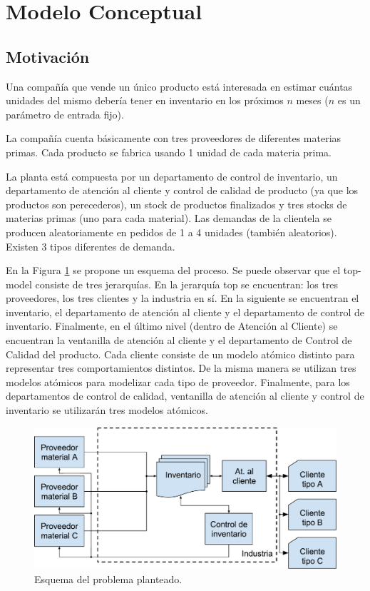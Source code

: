 \documentclass[10pt]{article}
\begin{document}
\section{Modelo Conceptual}
\subsection{Motivación}

Una compañía que vende un único producto está interesada en estimar cuántas unidades del mismo debería tener en inventario en los próximos $n$ meses ($n$ es un parámetro de entrada fijo).

La compañía cuenta básicamente con tres proveedores de diferentes materias primas. Cada producto se fabrica usando 1 unidad de cada materia prima.

La planta está compuesta por un departamento de control de inventario, un departamento de atención al cliente y control de calidad de producto (ya que los productos son perecederos), un stock de productos finalizados y tres stocks de materias primas (uno para cada material). Las demandas de la clientela se producen aleatoriamente en pedidos de 1 a 4 unidades (también aleatorios). Existen 3 tipos diferentes de demanda.

En la Figura \ref{fig:esquema-del-problema} se propone un esquema del proceso. Se puede observar que el top-model consiste de tres jerarquías. En la jerarquía top se encuentran: los tres proveedores, los tres clientes y la industria en sí. En la siguiente se encuentran el inventario, el departamento de atención al cliente y el departamento de control de inventario. Finalmente, en el último nivel (dentro de Atención al Cliente) se encuentran la ventanilla de atención al cliente y el departamento de Control de Calidad del producto.
Cada cliente consiste de un modelo atómico distinto para representar tres comportamientos distintos. De la misma manera se utilizan tres modelos atómicos para modelizar cada tipo de proveedor. Finalmente, para los departamentos de control de calidad, ventanilla de atención al cliente y control de inventario se utilizarán tres modelos atómicos.

\begin{figure}
\centering
\includegraphics[scale=0.7]{img/figura1}
\caption{Esquema del problema planteado.}
\label{fig:esquema-del-problema}
\end{figure}
\end{document}
